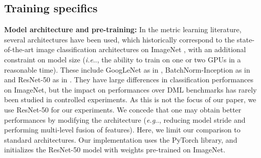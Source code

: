 \documentclass[runningheads]{llncs}
\makeatletter
\DeclareRobustCommand\onedot{\futurelet\@let@token\@onedot}
\def\@onedot{\ifx\@let@token.\else.\null\fi\xspace}
\def\eg{\emph{e.g}\onedot} \def\Eg{\emph{E.g}\onedot}
\def\ie{\emph{i.e}\onedot} \def\Ie{\emph{I.e}\onedot}
\makeatother
\begin{document}
\subsection{Training specifics}

\textbf{Model architecture and pre-training:}
In the metric learning literature, several architectures have been used, which historically correspond to the state-of-the-art image classification architectures on ImageNet \cite{deng2009imagenet}, with an additional constraint on model size (\ie, the ability to train on one or two GPUs in a reasonable time). These include GoogLeNet \cite{szegedy2015going} as in \cite{kim2018attention}, BatchNorm-Inception \cite{szegedy2016rethinking} as in \cite{wang2019multi} and ResNet-50 \cite{he2016identity} as in \cite{xuan2020improved}. They have large differences in classification performances on ImageNet, but the impact on performances over DML benchmarks has rarely been studied in controlled experiments. As this is not the focus of our paper, we use ResNet-50 for our experiments. We concede that one may obtain better performances by modifying the architecture (\eg, reducing model stride and performing multi-level fusion of features). Here, we limit our comparison to standard architectures. Our implementation uses the PyTorch \cite{NIPS2019_9015} library, and initializes the ResNet-50 model with  weights pre-trained on ImageNet.
\end{document}
